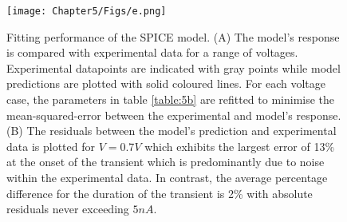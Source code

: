 \begin{figure}[htbp!] 
    \centering    
    \texttt{[image: Chapter5/Figs/e.png]}
    \caption[Fitting performance of the SPICE model.]{Fitting performance of the SPICE model. (A) The model’s response is compared with experimental data for a range of voltages. Experimental datapoints are indicated with gray points while model predictions are plotted with solid coloured lines. For each voltage case, the parameters in table \ref{table:5b} are refitted to minimise the mean-squared-error between the experimental and model's response. (B) The residuals between the model's prediction and experimental data is plotted for $V=0.7V$  which exhibits the largest error of 13\% at the onset of the transient which is predominantly due to noise within the experimental data. In contrast, the average percentage difference for the duration of the transient is 2\% with absolute residuals never exceeding $5nA$.}
    \label{fig:5e}
\end{figure}





